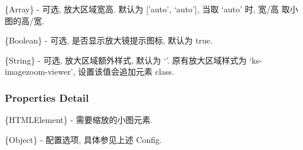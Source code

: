 \documentclass[letterpaper,10pt,english]{sphinxmanual}
\begin{document}

\begin{fulllineitems}
\label{api/component/imagezoom/index:ImageZoom.zoomSize}
\{Array\} - 可选, 放大区域宽高. 默认为 {[}'auto', `auto'{]}, 当取 `auto' 时, 宽/高 取小图的高/宽.

\end{fulllineitems}



\begin{fulllineitems}
\label{api/component/imagezoom/index:ImageZoom.lensIcon}
\{Boolean\} - 可选, 是否显示放大镜提示图标, 默认为 true.

\end{fulllineitems}



\begin{fulllineitems}
\label{api/component/imagezoom/index:ImageZoom.zoomCls}
\{String\} - 可选, 放大区域额外样式, 默认为 `'. 原有放大区域样式为 `ks-imagezoom-viewer', 设置该值会追加元素 class.

\end{fulllineitems}



\subsubsection{Properties Detail}
\label{api/component/imagezoom/index:properties-detail}

\begin{fulllineitems}
\label{api/component/imagezoom/index:ImageZoom.image}
\{HTMLElement\} - 需要缩放的小图元素.

\end{fulllineitems}



\begin{fulllineitems}
\label{api/component/imagezoom/index:ImageZoom.config}
\{Object\} - 配置选项, 具体参见上述 Config.

\end{fulllineitems}
\end{document}
